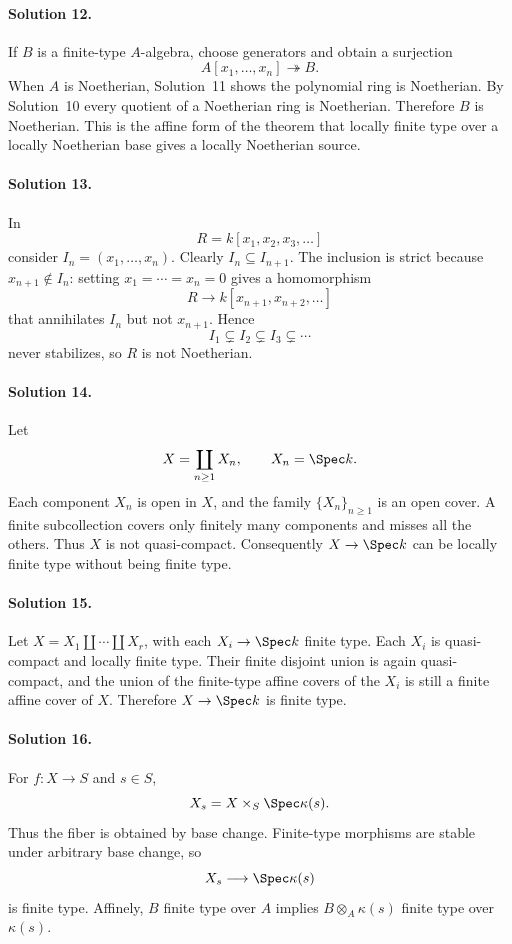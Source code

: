 \paragraph{Solution 12.}
If \(B\) is a finite-type \(A\)-algebra, choose generators and obtain a surjection
\[
A[x_1,\ldots,x_n]\twoheadrightarrow B.
\]
When \(A\) is Noetherian, Solution~11 shows the polynomial ring is Noetherian.  By Solution~10 every
quotient of a Noetherian ring is Noetherian.  Therefore \(B\) is Noetherian.  This is the affine
form of the theorem that locally finite type over a locally Noetherian base gives a locally
Noetherian source.

\paragraph{Solution 13.}
In
\[
R=k[x_1,x_2,x_3,\ldots]
\]
consider \(I_n=(x_1,\ldots,x_n)\).  Clearly \(I_n\subseteq I_{n+1}\).  The inclusion is strict
because \(x_{n+1}\notin I_n\): setting \(x_1=\cdots=x_n=0\) gives a homomorphism
\[
R\longrightarrow k[x_{n+1},x_{n+2},\ldots]
\]
that annihilates \(I_n\) but not \(x_{n+1}\).  Hence
\[
I_1\subsetneq I_2\subsetneq I_3\subsetneq\cdots
\]
never stabilizes, so \(R\) is not Noetherian.

\paragraph{Solution 14.}
Let
\[
X=\coprod_{n\ge1}X_n,\qquad X_n=\Spec k.
\]
Each component \(X_n\) is open in \(X\), and the family \(\{X_n\}_{n\ge1}\) is an open cover.  A
finite subcollection covers only finitely many components and misses all the others.  Thus \(X\) is
not quasi-compact.  Consequently \(X\to\Spec k\) can be locally finite type without being finite
type.

\paragraph{Solution 15.}
Let \(X=X_1\amalg\cdots\amalg X_r\), with each \(X_i\to\Spec k\) finite type.  Each \(X_i\) is
quasi-compact and locally finite type.  Their finite disjoint union is again quasi-compact, and the
union of the finite-type affine covers of the \(X_i\) is still a finite affine cover of \(X\).
Therefore \(X\to\Spec k\) is finite type.

\paragraph{Solution 16.}
For \(f:X\to S\) and \(s\in S\),
\[
X_s=X\times_S\Spec\kappa(s).
\]
Thus the fiber is obtained by base change.  Finite-type morphisms are stable under arbitrary base
change, so
\[
X_s\longrightarrow\Spec\kappa(s)
\]
is finite type.  Affinely, \(B\) finite type over \(A\) implies
\(B\otimes_A\kappa(s)\) finite type over \(\kappa(s)\).

